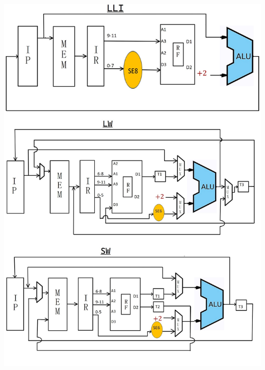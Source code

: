 \documentclass{article}
\begin{document}
    \begin{center}
          \includegraphics[width = 0.99\linewidth]{Images/2.jpg}
      \end{center}
\end{document}

